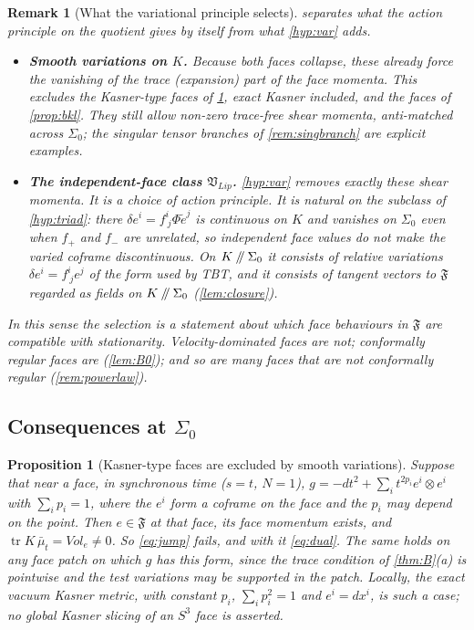 \documentclass[11pt]{article}
\theoremstyle{canonmath}
\newtheorem{remark}[theorem]{Remark}
\theoremstyle{canonpostulate}
\theoremstyle{canonproposition}
\theoremstyle{canonmath}
\newtheorem{proposition*}[theorem]{Proposition}
\theoremstyle{canonproposition}
\providecommand{\cutK}{\Klein\mathbin{/\mkern-5mu/}\Sigma_0}
\providecommand{\Vlip}{\mathfrak{V}_{\mathrm{Lip}}}
\providecommand{\Fcl}{\mathfrak{F}}
\providecommand{\Klein}{\mathcal{K}}
\def\mathrm#1{#1}%
\def\mathcal#1{#1}%
\begin{document}
\begin{remark}[What the variational principle selects]\label{rem:selection}
 separates what the action principle on the quotient gives by itself from what \ref{hyp:var} adds.
\begin{itemize}
\item \textbf{Smooth variations on $\Klein$.} Because both faces collapse, these already force the vanishing of the trace (expansion) part of the face momenta. This excludes the Kasner-type faces of \cref{prop:kasner}, exact Kasner included, and the faces of \cref{prop:bkl}. They still allow non-zero trace-free shear momenta, anti-matched across $\Sigma_0$; the singular tensor branches of \cref{rem:singbranch} are explicit examples.
\item \textbf{The independent-face class $\Vlip$.} \ref{hyp:var} removes exactly these shear momenta. It is a choice of action principle. It is natural on the subclass of \ref{hyp:triad}: there $\delta e^i = f^i_{\ j}\Phi\tilde e^j$ is continuous on $\Klein$ and vanishes on $\Sigma_0$ even when $f_+$ and $f_-$ are unrelated, so independent face values do not make the varied coframe discontinuous. On $\cutK$ it consists of relative variations $\delta e^i = f^i_{\ j}e^j$ of the form used by TBT, and it consists of tangent vectors to $\Fcl$ regarded as fields on $\cutK$ (\cref{lem:closure}).
\end{itemize}
In this sense the selection is a statement about which face behaviours in $\Fcl$ are compatible with stationarity. Velocity-dominated faces are not; conformally regular faces are (\cref{lem:B0}); and so are many faces that are not conformally regular (\cref{rem:powerlaw}).
\end{remark}

\subsection{Consequences at \texorpdfstring{$\Sigma_0$}{Sigma0}}

\begin{proposition*}[Kasner-type faces are excluded by smooth variations]\label{prop:kasner}
Suppose that near a face, in synchronous time ($s = t$, $N = 1$), $g = -dt^2 + \sum_i t^{2p_i}e^i\otimes e^i$ with $\sum_ip_i = 1$, where the $e^i$ form a coframe on the face and the $p_i$ may depend on the point. Then $e\in\Fcl$ at that face, its face momentum exists, and $\operatorname{tr}K\,\bar\mu_t = \mathrm{Vol}_e\neq0$. So \eqref{eq:jump} fails, and with it \eqref{eq:dual}. The same holds on any face patch on which $g$ has this form, since the trace condition of \cref{thm:B}(a) is pointwise and the test variations may be supported in the patch. Locally, the exact vacuum Kasner metric, with constant $p_i$, $\sum_ip_i^2 = 1$ and $e^i = dx^i$, is such a case; no global Kasner slicing of an $S^3$ face is asserted.
\end{proposition*}
\end{document}
